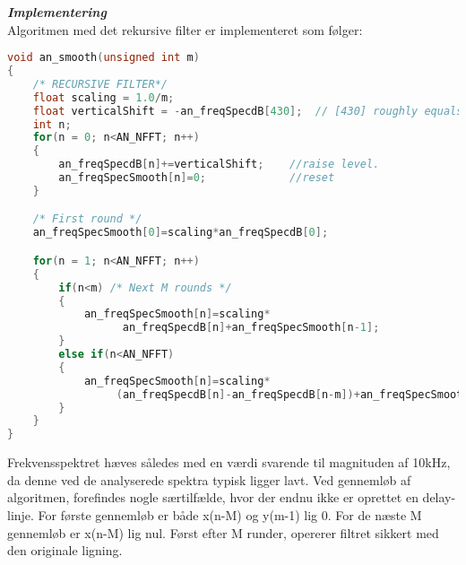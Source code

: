 \textbf{\textit{Implementering}} \\
Algoritmen med det rekursive filter er implementeret som følger:
\begin{lstlisting}[language=C,numbers=none]
void an_smooth(unsigned int m)
{
    /* RECURSIVE FILTER*/
    float scaling = 1.0/m;
    float verticalShift = -an_freqSpecdB[430];	// [430] roughly equals 10 kHz
    int n;
    for(n = 0; n<AN_NFFT; n++)
    {
        an_freqSpecdB[n]+=verticalShift;    //raise level.
        an_freqSpecSmooth[n]=0;             //reset
    }

    /* First round */
    an_freqSpecSmooth[0]=scaling*an_freqSpecdB[0];

    for(n = 1; n<AN_NFFT; n++)
    {
        if(n<m)	/* Next M rounds */
        {
            an_freqSpecSmooth[n]=scaling*
                  an_freqSpecdB[n]+an_freqSpecSmooth[n-1];
        }
        else if(n<AN_NFFT)
        {
            an_freqSpecSmooth[n]=scaling*
                 (an_freqSpecdB[n]-an_freqSpecdB[n-m])+an_freqSpecSmooth[n-1];
        }
    }
}\end{lstlisting}
Frekvensspektret hæves således med en værdi svarende til magnituden af 10kHz, da denne ved de analyserede spektra typisk ligger lavt. Ved gennemløb af algoritmen, forefindes nogle særtilfælde, hvor der endnu ikke er oprettet en delay-linje. For første gennemløb er både x(n-M) og y(m-1) lig 0. For de næste M gennemløb er x(n-M) lig nul. Først efter M runder, opererer filtret sikkert med den originale ligning.